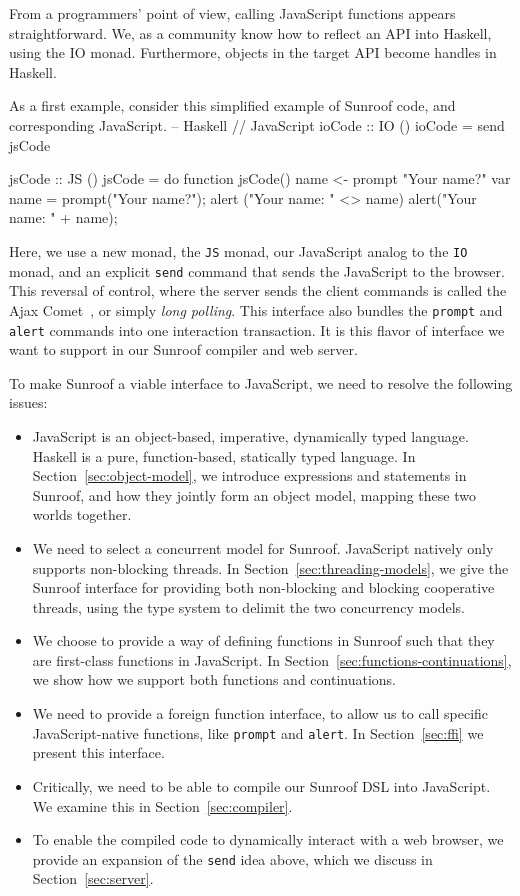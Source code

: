 \documentclass{llncs}
\newcommand{\Src}[1]{{\tt{#1}}}
\newenvironment{Code}{\verbatim}{\endverbatim}
\begin{document}
From a programmers' point of view, calling JavaScript functions
appears straightforward. We, as a community know how to reflect an
API into Haskell, using the IO monad. Furthermore, objects in
the target API become handles in Haskell. 

As a first example, consider this simplified example of Sunroof code, and corresponding JavaScript.
\noindent
\begin{Code}
-- Haskell                          // JavaScript
ioCode :: IO ()
ioCode = send jsCode

jsCode :: JS ()
jsCode = do                        function jsCode() {
   name <- prompt "Your name?"       var name = prompt("Your name?"); 
   alert ("Your name: " <> name)     alert("Your name: " + name); 
                                   }
\end{Code}%

Here, we use a new monad, the \Src{JS} monad, our JavaScript
analog to the \Src{IO} monad,
and an explicit \Src{send} command that sends the JavaScript to the browser.
This reversal of control, where the
server sends the client commands is called the Ajax Comet~\cite{..},
or simply {\em long polling\/}.
This interface also bundles the \Src{prompt} and \Src{alert} commands
into one interaction transaction.
It is this flavor of interface we want to support in our Sunroof compiler
and web server.  

To make Sunroof a viable interface to JavaScript, we need to
resolve the following issues:
\begin{itemize}
\item JavaScript is an object-based, imperative, dynamically typed language.
Haskell is a pure, function-based, statically typed language.
In Section~\ref{sec:object-model}, we introduce expressions and statements
in Sunroof, and how they jointly form an object model,
mapping these two worlds together.
%
\item We need to select a concurrent model for Sunroof.
JavaScript natively only supports non-blocking threads.
In Section~\ref{sec:threading-models}, we give the
Sunroof interface for providing both non-blocking and blocking cooperative threads,
using the type system to delimit the two concurrency models.
%
\item We choose to provide a way of defining functions
in Sunroof such that they are first-class functions
in JavaScript. In Section~\ref{sec:functions-continuations},
we show how we support both functions and continuations.
%
\item We need to provide a foreign function interface,
to allow us to call specific JavaScript-native functions,
like \Src{prompt} and \Src{alert}.
In Section~\ref{sec:ffi} we present this interface.
%
\item Critically, we need to be able to compile our Sunroof DSL
into JavaScript. We examine this in Section~\ref{sec:compiler}.
\item To enable the compiled code to dynamically interact with
a web browser, we provide an expansion of the \Src{send} idea above,
which we discuss in Section~\ref{sec:server}.
\end{itemize}
\end{document}
